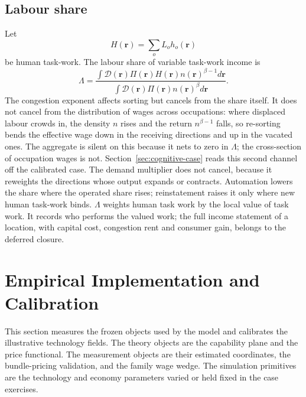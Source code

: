 \documentclass[12pt, a4paper]{article}
\begin{document}
\subsection{Labour share}
\label{sec:labour-share}

Let
\[
  H(\mathbf{r})
  =
  \sum_o L_o h_o(\mathbf{r})
\]
be human task-work. The labour share of variable task-work income is
\begin{equation}
  \Lambda
  =
  \frac{
    \int
    \mathcal{D}(\mathbf{r})
    \Pi(\mathbf{r})
    H(\mathbf{r})
    n(\mathbf{r})^{\beta-1}
    d\mathbf{r}
  }{
    \int
    \mathcal{D}(\mathbf{r})
    \Pi(\mathbf{r})
    n(\mathbf{r})^\beta
    d\mathbf{r}
  }.
  \label{eq:labour-share}
\end{equation}
The congestion exponent affects sorting but cancels from the share
itself. It does not cancel from the distribution of wages across
occupations: where displaced labour crowds in, the density $n$ rises
and the return $n^{\beta-1}$ falls, so re-sorting bends the effective
wage down in the receiving directions and up in the vacated ones. The
aggregate is silent on this because it nets to zero in $\Lambda$; the
cross-section of occupation wages is not. Section~\ref{sec:cognitive-case}
reads this second channel off the calibrated case.
The demand multiplier does not cancel, because it reweights the
directions whose output expands or contracts. Automation lowers the
share where the operated share rises; reinstatement raises it only where
new human task-work binds. $\Lambda$ weights human task work by the
local value of task work. It records who performs the valued work; the
full income statement of a location, with capital cost, congestion rent
and consumer gain, belongs to the deferred closure.

\section{Empirical Implementation and Calibration}
\label{sec:implementation}

This section measures the frozen objects used by the model and
calibrates the illustrative technology fields. The theory objects are
the capability plane and the price functional. The measurement objects
are their estimated coordinates, the bundle-pricing validation, and the
family wage wedge. The simulation primitives are the technology and
economy parameters varied or held fixed in the case exercises.
\end{document}

